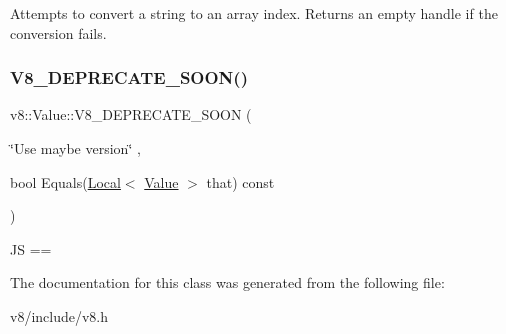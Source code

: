 Attempts to convert a string to an array index. Returns an empty handle if the conversion fails. \mbox{\label{classv8_1_1Value_ae3528a485935d1b19a0e007cd5a06799}} 
\subsubsection{\texorpdfstring{V8\+\_\+\+D\+E\+P\+R\+E\+C\+A\+T\+E\+\_\+\+S\+O\+O\+N()}{V8\_DEPRECATE\_SOON()}}
{\footnotesize\ttfamily v8\+::\+Value\+::\+V8\+\_\+\+D\+E\+P\+R\+E\+C\+A\+T\+E\+\_\+\+S\+O\+ON (\begin{DoxyParamCaption}\item[{\char`\"{}Use maybe version\char`\"{}}]{,  }\item[{bool Equals(\mbox{\hyperlink{classv8_1_1Local}{Local}}$<$ \mbox{\hyperlink{classv8_1_1Value}{Value}} $>$ that)}]{const }\end{DoxyParamCaption})}

JS == 

The documentation for this class was generated from the following file\+:\begin{DoxyCompactItemize}
\item 
v8/include/v8.\+h\end{DoxyCompactItemize}
